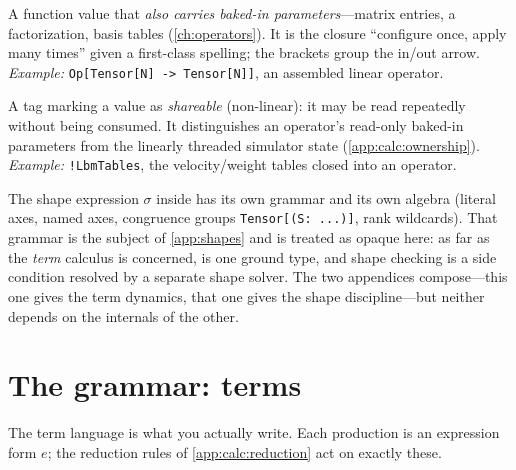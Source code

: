 \begin{description}[style=nextline, leftmargin=1.4em, font=\normalfont\itshape]
  \item[Operators \code{Op[$\tau_{\text{in}} \to \tau_{\text{out}}$]}.] A function
  value that \emph{also carries baked-in parameters}---matrix entries, a
  factorization, basis tables (\cref{ch:operators}). It is the closure ``configure
  once, apply many times'' given a first-class spelling; the brackets group the
  in/out arrow. \emph{Example:}
  \lstinline[style=l4style]|Op[Tensor[N] -> Tensor[N]]|, an assembled linear
  operator.
  \item[The shareable annotation \code{!$\tau$}.] A tag marking a value as
  \emph{shareable} (non-linear): it may be read repeatedly without being consumed.
  It distinguishes an operator's read-only baked-in parameters from the linearly
  threaded simulator state (\cref{app:calc:ownership}). \emph{Example:}
  \lstinline[style=l4style]|!LbmTables|, the velocity/weight tables closed into an
  operator.
\end{description}

\begin{notationbox}
The shape expression $\sigma$ inside  has its own grammar
and its own algebra (literal axes, named axes, congruence groups
\lstinline[style=l4style]|Tensor[(S: ...)]|, rank wildcards). That grammar is the
subject of \cref{app:shapes} and is treated as opaque here: as far as the
\emph{term} calculus is concerned,  is one ground type,
and shape checking is a side condition resolved by a separate shape solver. The
two appendices compose---this one gives the term dynamics, that one gives the
shape discipline---but neither depends on the internals of the other.
\end{notationbox}

\section{The grammar: terms}
\label{app:calc:terms}

The term language is what you actually write. Each production is an expression
form $e$; the reduction rules of \cref{app:calc:reduction} act on exactly these.

